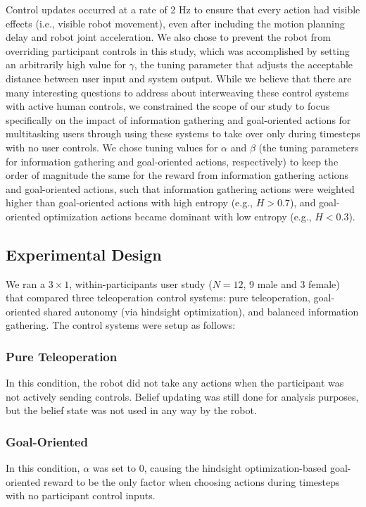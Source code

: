 \documentclass[conference]{IEEEtran}
\begin{document}
Control updates occurred at a rate of 2 Hz to ensure that every action had visible effects (i.e., visible robot movement), even after including the motion planning delay and robot joint acceleration. We also chose to prevent the robot from overriding participant controls in this study, which was accomplished by setting an arbitrarily high value for $\gamma$, the tuning parameter that adjusts the acceptable distance between user input and system output. While we believe that there are many interesting questions to address about interweaving these control systems with active human controls, we constrained the scope of our study to focus specifically on the impact of information gathering and goal-oriented actions for multitasking users through using these systems to take over only during timesteps with no user controls. We chose tuning values for $\alpha$ and $\beta$ (the tuning parameters for information gathering and goal-oriented actions, respectively) to keep the order of magnitude the same for the reward from information gathering actions and goal-oriented actions, such that information gathering actions were weighted higher than goal-oriented actions with high entropy (e.g., $H > 0.7$), and goal-oriented optimization actions became dominant with low entropy (e.g., $H < 0.3$).

\subsection{Experimental Design}

We ran a $3 \times 1$, within-participants user study ($N = 12$, 9 male and 3 female) that compared three teleoperation control systems: pure teleoperation,  goal-oriented shared autonomy (via hindsight optimization), and balanced information gathering. The control systems were setup as follows:

\subsubsection{Pure Teleoperation}
In this condition, the robot did not take any actions when the participant was not actively sending controls. Belief updating was still done for analysis purposes, but the belief state was not used in any way by the robot.
\subsubsection{Goal-Oriented}
In this condition, $\alpha$ was set to 0, causing the hindsight optimization-based goal-oriented reward to be the only factor when choosing actions during timesteps with no participant control inputs.
\end{document}
